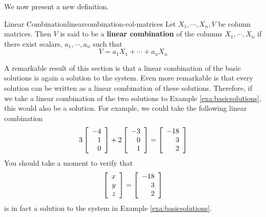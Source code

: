 We now present a new definition. 

\begin{definition}{Linear Combination}{linearcombination-col-matrices}
Let $X_1,\cdots ,X_n,V$ be column matrices. Then 
$V$ is said to be a \textbf{linear combination}
 of the columns $X_1,\cdots , X_n $ 
if there exist scalars, $a_{1},\cdots ,a_{n}$ such
that
\begin{equation*}
V = a_1 X_1 + \cdots + a_n X_n
\end{equation*}
\end{definition}

A remarkable result of this section is that a linear combination of the basic solutions is again a solution to the system.
Even more remarkable is that every solution can be written as a linear combination of these solutions. 
Therefore, if we take a linear combination of the two solutions to Example \ref{exa:basicsolutions},
this would also be a solution. 
For example, we could take the following linear combination
\begin{equation*}
3
\left[
\begin{array}{r}
-4 \\
1 \\
0
\end{array}
\right]
+
2
\left[
\begin{array}{r}
-3 \\
0\\
1
\end{array}
\right]
 =
\left[
\begin{array}{r}
-18 \\
3 \\
2
\end{array}
\right]
\end{equation*}
You should take a moment to verify that
\begin{equation*}
\left[
\begin{array}{r}
x \\
y \\
z
\end{array}
\right]
=
\left[
\begin{array}{r}
-18 \\
3 \\
2
\end{array}
\right]
\end{equation*}
is in fact a solution to the system in Example \ref{exa:basicsolutions}.

